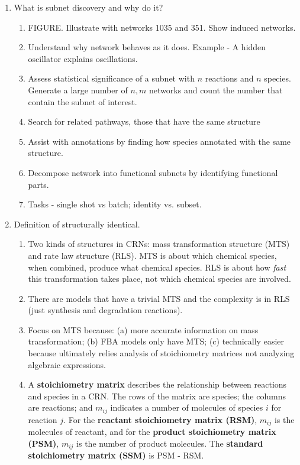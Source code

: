 \documentclass{article}
\begin{document}
\begin{enumerate}
        \item What is subnet discovery and why do it?
        \begin{enumerate}
        \item FIGURE. Illustrate with networks 1035 and 351. Show induced networks.
            \item Understand why network behaves as it does. Example - A hidden oscillator explains oscillations.
            \item Assess statistical significance of a subnet with $n$ reactions and $n$ species. Generate a large number of $n,m$ networks and count the number that contain the subnet of interest.
            \item Search for related pathways, those that have the same structure
            \item Assist with annotations by finding how species annotated with the same structure.
            \item Decompose network into functional subnets by identifying functional parts.
            \item Tasks - single shot vs batch; identity vs. subset.
        \end{enumerate}
    \item Definition of structurally identical. 
    \begin{enumerate}
        \item Two kinds of structures in CRNs: mass transformation structure (MTS) and rate law structure (RLS). MTS is about which chemical species, when combined, produce what chemical species. RLS is about how {\em fast} this transformation takes place, not which chemical species are involved.
        \item There are models that have a trivial MTS and the complexity is in RLS (just synthesis and degradation reactions).
        
        \item Focus on MTS because: (a) more accurate information on mass transformation; (b) FBA models only have MTS; (c) technically easier because ultimately relies analysis of stoichiometry matrices not analyzing algebraic expressions.

        \item A {\bf stoichiometry matrix} describes the relationship between reactions and species in a CRN. The rows of the matrix are species; the columns are reactions; and  $m_{ij}$ indicates a number of molecules of species $i$ for reaction $j$. For the {\bf reactant stoichiometry matrix (RSM)}, $m_{ij}$ is the molecules of reactant, and for the {\bf product stoichiometry matrix (PSM)}, $m_{ij}$ is the number of product molecules. The {\bf standard stoichiometry matrix (SSM)} is PSM - RSM.


\end{enumerate}
\end{enumerate}
\end{document}
